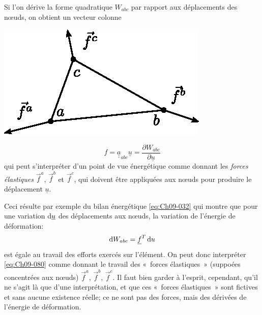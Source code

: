 Si l'on dérive la forme quadratique $W_{abc}$ par rapport aux déplacements des nœuds, on obtient un vecteur colonne
\begin{multicols}{2}
    \begin{center}
        \includegraphics{../images/T1_Ch09-08}
    \end{center}
    \columnbreak
\begin{equation}
    f = \underline{\underline{a}}_{abc} \underline{u} = \frac{\partial W_{abc}}{\partial \underline{u}}
    \label{eq:Ch09-079}
\end{equation}
qui peut s'interpréter d'un point de vue énergétique comme donnant les \emph{forces élastiques} $\vec{f}^a$, $\vec{f}^b$ et $\vec{f}^c$, qui doivent être appliquées aux nœuds pour produire le déplacement $\underline{u}$.
\end{multicols}
Ceci résulte par exemple du bilan énergétique \eqref{eq:Ch09-032} qui montre que pour une variation $\mathop{\mathrm{{}d}}\mathopen{} \underline{u}$ des déplacements aux nœuds, la variation de l'énergie de déformation: 
\begin{equation}
    \mathop{\mathrm{{}d}}\mathopen{} W_{abc} = \underline{f}^T \mathop{\mathrm{{}d}}\mathopen{} u
    \label{eq:Ch09-080}
\end{equation}
est égale au travail des efforts exercés sur l'élément.
On peut donc interpréter \eqref{eq:Ch09-080} comme donnant le travail des «~forces élastiques~» (suppoées concentrées aux nœuds) $\vec{f}^a$, $\vec{f}^b$, $\vec{f}^c$.
Il faut bien garder à l'esprit, cependant, qu'il ne s'agit là que d'une interprétation, et que ces «~forces élastiques~» sont fictives et sans aucune existence réelle; ce ne sont pas 
des forces, mais des dérivées de l'énergie de déformation. 
